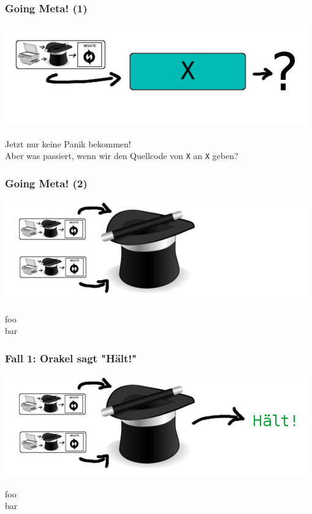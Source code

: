 \documentclass[aspectratio=43]{beamer}
\begin{document}

\begin{frame}
\frametitle{Going Meta! (1)}
\begin{center}
\includegraphics[scale=1.4]{images/input.png} 
\bigskip

Jetzt nur keine Panik bekommen!\\

Aber was passiert, wenn wir den Quellcode von \texttt{X} an \texttt{X} geben?
\end{center}
\end{frame}


\begin{frame}
\frametitle{Going Meta! (2)}

\begin{center}
\includegraphics[scale=1.4]{images/input_hat_nothing.png} 
\bigskip

foo\\
bar
\end{center}
\end{frame}


\begin{frame}
\frametitle{Fall 1: Orakel sagt "Hält!"}

\begin{center}
\includegraphics[scale=1.4]{images/input_hat_halts.png} 
\bigskip

foo\\
bar
\end{center}
\end{frame}
\end{document}

